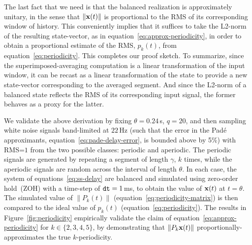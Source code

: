 The last fact that we need is that the balanced realization is approximately unitary, in the sense that $\| \mathbf{x}(t) \|$ is proportional to the RMS of its corresponding window of history.
This conveniently implies that it suffices to take the L2-norm of the resulting state-vector, as in equation~\ref{eq:approx-periodicity}, in order to obtain a proportional estimate of the RMS, $p_k(t)$, from equation~\ref{eq:periodicity}.
This completes our proof sketch.
To summarize, since the superimposed-averaging computation is a linear transformation of the input window, it can be recast as a linear transformation of the state to provide a new state-vector corresponding to the averaged segment.
And since the L2-norm of a balanced state reflects the RMS of its corresponding input signal, the former behaves as a proxy for the latter.


We validate the above derivation by fixing $\theta=0.24$\,s, $q=20$, and then sampling white noise signals band-limited at $22$\,Hz (such that the error in the Pad\'e approximants, equation~\ref{eq:pade-delay-error}, is bounded above by 5\%) with RMS=$1$ from the two possible classes: periodic and aperiodic.
The periodic signals are generated by repeating a segment of length $\gamma$, $k$ times, while the aperiodic signals are random across the interval of length $\theta$.
In each case, the system of equations~\ref{eq:ss-delay} are balanced and simulated using zero-order hold~(ZOH) with a time-step of $\texttt{dt}{} = 1$\,ms, to obtain the value of $\mathbf{x}(t)$ at $t = \theta$.
The simulated value of $\| P_k(t) \|$ (equation~\ref{eq:periodicity-matrix}) is then compared to the ideal value of $p_k(t)$ (equation~\ref{eq:periodicity}).
The results in Figure~\ref{fig:periodicity} empirically validate the claim of equation~\ref{eq:approx-periodicity} for $k \in \{2, 3, 4, 5\}$, by demonstrating that $\|P_k \mathbf{x}(t) \|$ proportionally-approximates the true $k$-periodicity.

